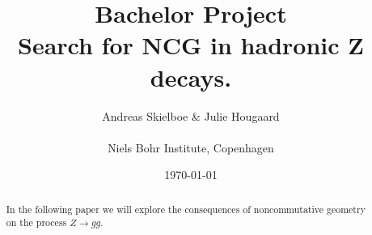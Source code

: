 \documentclass[11pt,a4paper,titlepage]{article}
\numberwithin{equation}{section}
\begin{document}
\title{Bachelor Project\\Search for NCG in hadronic Z decays.}
\author{Andreas Skielboe \& Julie Hougaard \\ \\ Niels Bohr Institute, Copenhagen}
\date{\today}
\maketitle
{}

\begin{abstract}
In the following paper we will explore the consequences of noncommutative geometry on the process $Z \rightarrow gg$.
\end{abstract}

\clearpage
\tableofcontents
\clearpage





\clearpage












\clearpage


\clearpage



\end{document}

